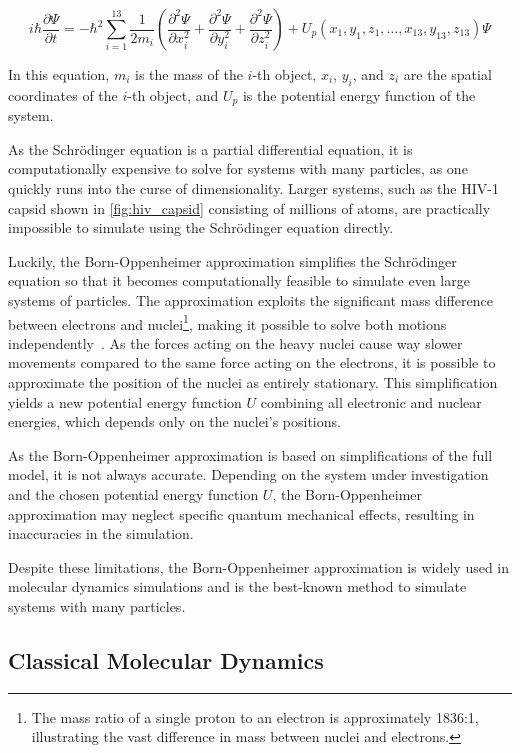\begin{equation}
      i \hbar \frac{\partial \Psi}{\partial t} = -\hbar^2 \sum_{i=1}^{13} \frac{1}{2m_i} \left( \frac{\partial^2 \Psi}{\partial x_i^2} + \frac{\partial^2 \Psi}{\partial y_i^2} + \frac{\partial^2 \Psi}{\partial z_i^2} \right) + U_p (x_1, y_1, z_1, \ldots, x_{13}, y_{13}, z_{13}) \Psi
\end{equation}

In this equation, $m_i$ is the mass of the $i$-th object, $x_i$, $y_i$, and $z_i$ are the spatial coordinates of the $i$-th object, and $U_p$ is the potential energy function of the system.
\smallskip

As the Schrödinger equation is a partial differential equation, it is computationally expensive to solve for systems with many particles, as one quickly runs into the curse of dimensionality. Larger systems, such as the HIV-1 capsid shown in \autoref{fig:hiv_capsid} consisting of millions of atoms, are practically impossible to simulate using the Schrödinger equation directly.

Luckily, the Born-Oppenheimer approximation simplifies the Schrödinger equation so that it becomes computationally feasible to simulate even large systems of particles. The approximation exploits the significant mass difference between electrons and nuclei\footnote{
      The mass ratio of a single proton to an electron is approximately 1836:1, illustrating the vast difference in mass between nuclei and electrons.
}, making it possible to solve both motions independently~\cite{Zielinski2013}. As the forces acting on the heavy nuclei cause way slower movements compared to the same force acting on the electrons, it is possible to approximate the position of the nuclei as entirely stationary. This simplification yields a new potential energy function $U$ combining all electronic and nuclear energies, which depends only on the nuclei's positions.

As the Born-Oppenheimer approximation is based on simplifications of the full model, it is not always accurate. Depending on the system under investigation and the chosen potential energy function $U$, the Born-Oppenheimer approximation may neglect specific quantum mechanical effects, resulting in inaccuracies in the simulation.

Despite these limitations, the Born-Oppenheimer approximation is widely used in molecular dynamics simulations and is the best-known method to simulate systems with many particles.

\subsection{Classical Molecular Dynamics}

